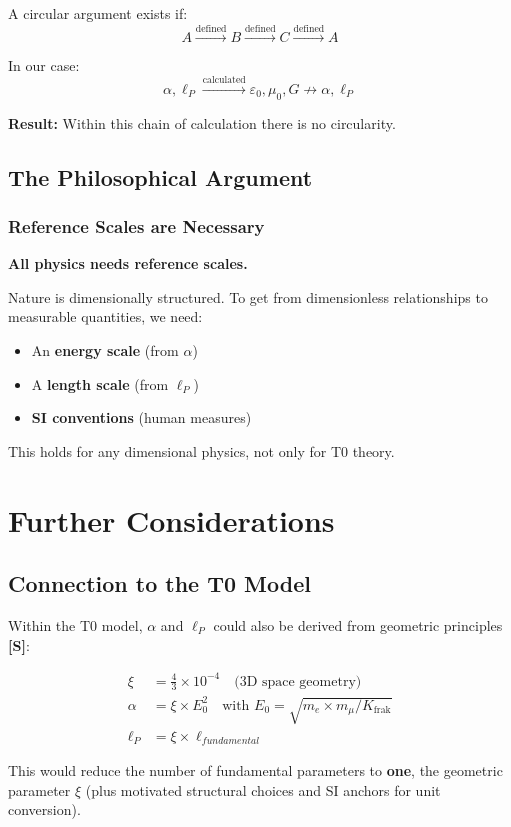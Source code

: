 	A circular argument exists if:
	\begin{equation}
		A \xrightarrow{\text{defined}} B \xrightarrow{\text{defined}} C \xrightarrow{\text{defined}} A
	\end{equation}
	
	In our case:
	\begin{equation}
		\alpha, \ell_P \xrightarrow{\text{calculated}} \varepsilon_0, \mu_0, G \not\rightarrow \alpha, \ell_P
	\end{equation}
	
	\textbf{Result:} Within this chain of calculation there is no circularity.
	
	\subsection{The Philosophical Argument}
	
	\subsubsection{Reference Scales are Necessary}
	
	\begin{tcolorbox}[colback=blue!5!white,colframe=blue!75!black,title=Reference Scales]
		\textbf{All physics needs reference scales.}
		
		Nature is dimensionally structured. To get from dimensionless relationships to measurable quantities, we need:
		\begin{itemize}
			\item An \textbf{energy scale} (from $\alpha$)
			\item A \textbf{length scale} (from $\ell_P$) 
			\item \textbf{SI conventions} (human measures)
		\end{itemize}
		
		This holds for any dimensional physics, not only for T0 theory.
	\end{tcolorbox}
	
	\section{Further Considerations}
	
	\subsection{Connection to the T0 Model}
	
	Within the T0 model, $\alpha$ and $\ell_P$ could also be derived from geometric principles \textbf{[S]}:
	
	\begin{align}
		\xi &= \frac{4}{3} \times 10^{-4} \quad \text{(3D space geometry)}\\
		\alpha &= \xi \times E_0^2 \quad \text{with } E_0 = \sqrt{m_e \times m_\mu / K_{\text{frak}}}\\
		\ell_P &= \xi \times \ell_{fundamental}
	\end{align}
	
	This would reduce the number of fundamental parameters to \textbf{one}, the geometric parameter $\xi$ (plus motivated structural choices and SI anchors for unit conversion).
	